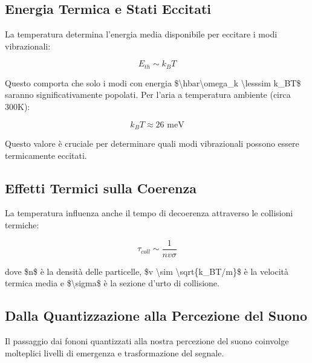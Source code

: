 \documentclass[a4paper,11pt]{article}
\begin{document}
\subsection{Energia Termica e Stati Eccitati}\hypertarget{energia-termica-e-stati-eccitati}{}\label{energia-termica-e-stati-eccitati}

La temperatura determina l'energia media disponibile per eccitare i modi
vibrazionali:

\begin{displaymath}
E_{th} \sim k_BT
\end{displaymath}

Questo comporta che solo i modi con energia
\$\textbackslash{}hbar\textbackslash{}omega\_k \textbackslash{}lesssim k\_BT\$ saranno significativamente popolati. Per
l'aria a temperatura ambiente (circa 300K):

\begin{displaymath}
k_BT \approx 26 \text{ meV}
\end{displaymath}

Questo valore è cruciale per determinare quali modi vibrazionali possono
essere termicamente eccitati.

\subsection{Effetti Termici sulla Coerenza}\hypertarget{effetti-termici-sulla-coerenza}{}\label{effetti-termici-sulla-coerenza}

La temperatura influenza anche il tempo di decoerenza attraverso le
collisioni termiche:

\begin{displaymath}
\tau_{coll} \sim \frac{1}{nv\sigma}
\end{displaymath}

dove \$n\$ è la densità delle particelle, \$v \textbackslash{}sim \textbackslash{}sqrt\{k\_BT/m\}\$ è la
velocità termica media e \$\textbackslash{}sigma\$ è la sezione d'urto di collisione.

\subsection{Dalla Quantizzazione alla Percezione del Suono}\hypertarget{dalla-quantizzazione-alla-percezione-del-suono}{}\label{dalla-quantizzazione-alla-percezione-del-suono}

Il passaggio dai fononi quantizzati alla nostra percezione del suono
coinvolge molteplici livelli di emergenza e trasformazione del segnale.
\end{document}
